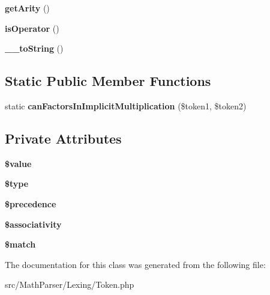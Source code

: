 \begin{DoxyCompactItemize}
\item 
\hypertarget{classMathParser_1_1Lexing_1_1Token_ab34d92857d22182fc8aa82bcd7e1de3a}{{\bfseries get\-Arity} ()}\label{classMathParser_1_1Lexing_1_1Token_ab34d92857d22182fc8aa82bcd7e1de3a}

\item 
\hypertarget{classMathParser_1_1Lexing_1_1Token_aa75fbfc8c2131200c664a6f9ab724915}{{\bfseries is\-Operator} ()}\label{classMathParser_1_1Lexing_1_1Token_aa75fbfc8c2131200c664a6f9ab724915}

\item 
\hypertarget{classMathParser_1_1Lexing_1_1Token_a25b9b060edcb1da92ec0a1358aac99c9}{{\bfseries \-\_\-\-\_\-to\-String} ()}\label{classMathParser_1_1Lexing_1_1Token_a25b9b060edcb1da92ec0a1358aac99c9}

\end{DoxyCompactItemize}
\subsection*{Static Public Member Functions}
\begin{DoxyCompactItemize}
\item 
\hypertarget{classMathParser_1_1Lexing_1_1Token_aeb8c3be1afc671d5046624be0fd83377}{static {\bfseries can\-Factors\-In\-Implicit\-Multiplication} (\$token1, \$token2)}\label{classMathParser_1_1Lexing_1_1Token_aeb8c3be1afc671d5046624be0fd83377}

\end{DoxyCompactItemize}
\subsection*{Private Attributes}
\begin{DoxyCompactItemize}
\item 
\hypertarget{classMathParser_1_1Lexing_1_1Token_ab38ab1ba987fcec7c3a9756ee867ee8a}{{\bfseries \$value}}\label{classMathParser_1_1Lexing_1_1Token_ab38ab1ba987fcec7c3a9756ee867ee8a}

\item 
\hypertarget{classMathParser_1_1Lexing_1_1Token_ac0bdf919e48920230f167b33d64d645f}{{\bfseries \$type}}\label{classMathParser_1_1Lexing_1_1Token_ac0bdf919e48920230f167b33d64d645f}

\item 
\hypertarget{classMathParser_1_1Lexing_1_1Token_abff30dfcb17ec3614e804e781f37d144}{{\bfseries \$precedence}}\label{classMathParser_1_1Lexing_1_1Token_abff30dfcb17ec3614e804e781f37d144}

\item 
\hypertarget{classMathParser_1_1Lexing_1_1Token_aabe062c3d8c3941dda6edd70ace7d925}{{\bfseries \$associativity}}\label{classMathParser_1_1Lexing_1_1Token_aabe062c3d8c3941dda6edd70ace7d925}

\item 
\hypertarget{classMathParser_1_1Lexing_1_1Token_ad46b5fb6088bc2252d7af6ede3426113}{{\bfseries \$match}}\label{classMathParser_1_1Lexing_1_1Token_ad46b5fb6088bc2252d7af6ede3426113}

\end{DoxyCompactItemize}


The documentation for this class was generated from the following file\-:\begin{DoxyCompactItemize}
\item 
src/\-Math\-Parser/\-Lexing/Token.\-php\end{DoxyCompactItemize}
